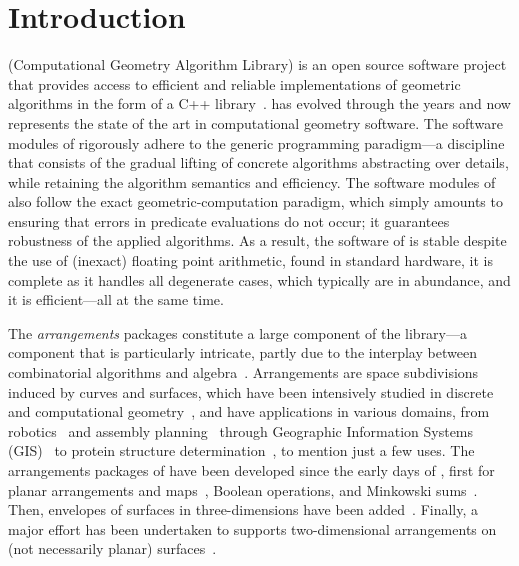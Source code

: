 \section{Introduction}
\label{sec:intro}
\cgal{} (Computational Geometry Algorithm Library) is an open source software project that provides access to efficient and reliable implementations of geometric algorithms in the form of a C++ library~\cite{cgal:eb-21}. \cgal{} has evolved through the years and now represents the state of the art in  computational geometry software. The software modules of \cgal{} rigorously adhere to the generic programming paradigm---a discipline that consists of the gradual lifting of concrete algorithms abstracting over details, while retaining the algorithm semantics and efficiency. The software modules of \cgal{} also follow the exact geometric-computation paradigm, which simply amounts to ensuring that errors in predicate evaluations do not occur; it guarantees robustness of the applied algorithms.  As a result, the software of \cgal{} is stable despite the use of (inexact) floating point arithmetic, found in standard hardware, it is complete as it handles all degenerate cases, which typically are in abundance, and it is efficient---all at the same time.

The \cgal{} \emph{arrangements} packages constitute a large component of the \cgal{} library---a component that is particularly intricate, partly due to the interplay between combinatorial algorithms and algebra~\cite{fhw-caass-12}. Arrangements are space subdivisions induced by curves and surfaces, which have been intensively studied in discrete and computational geometry~\cite{hs-a-18}, and have applications in various domains, from robotics~\cite{my-hs-atarr-95} and assembly planning~\cite{hlw-gfapm-00} through Geographic Information Systems (GIS)~\cite{DBLP:conf/gis/KreveldSW04} to protein structure determination~\cite{DBLP:journals/jcb/MartinYBZD11}, to mention just a few uses. The arrangements packages of \cgal{} have been developed since the early days of \cgal, first for planar arrangements and maps~\cite{DBLP:journals/jea/FlatoHHNE00, DBLP:journals/comgeo/WeinFZH07}, Boolean operations, and Minkowski sums~\cite{bfhhm-epsph-15}. Then, envelopes of surfaces in three-dimensions have been added~\cite{m-rgece-06}. Finally, a major effort has been undertaken to supports two-dimensional arrangements on (not necessarily planar) surfaces~\cite{bfhks-apsca-10,bfhmw-apsgf-10}.

